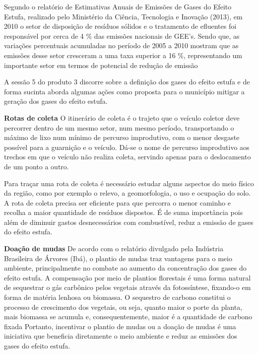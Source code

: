 Segundo o relatório de Estimativas Anuais de Emissões de Gases do Efeito Estufa, realizado pelo Ministério da Ciência, Tecnologia e Inovação (2013), em 2010 o setor de disposição de resíduos sólidos e o tratamento de efluentes foi responsável por cerca de 4 \% das emissões nacionais de GEE’s.
Sendo que, as variações percentuais acumuladas no período de 2005 a 2010 mostram que as emissões desse setor cresceram a uma taxa superior a 16 \%, representando um importante setor em termos de potencial de redução de emissão

A sessão 5 do produto 3 discorre sobre a definição dos gases do efeito estufa e de forma sucinta aborda algumas ações como proposta para o município mitigar a geração dos gases do efeito estufa. 

\textbf{Rotas de coleta}
O itinerário de coleta é o trajeto que o veículo coletor deve percorrer dentro de um mesmo setor, num mesmo período, transportando o máximo de lixo num mínimo de percurso improdutivo, com o menor desgaste possível para a guarnição e o veículo. Dá-se o nome de percurso improdutivo aos trechos em que o veículo não realiza coleta, servindo apenas para o deslocamento de um ponto a outro.\cite{dalmeida_manual_2018}

Para traçar uma rota de coleta é necessário estudar alguns aspectos do meio físico da região, como por exemplo o relevo, a geomorfologia, o uso e ocupação do solo. A rota de coleta precisa ser eficiente para que percorra o menor caminho e recolha a maior quantidade de resíduos dispostos. É de suma importância pois além de diminuir gastos desnecessários com combustível, reduz a emissão de gases do efeito estufa.

\textbf{Doação de mudas}
De acordo com o relatório divulgado pela Indústria Brasileira de Árvores (Ibá), o plantio de mudas traz vantagens para o meio ambiente, principalmente no combate ao aumento da concentração dos gases do efeito estufa.
A compensação por meio de plantios florestais é uma forma
natural de sequestrar o gás carbônico pelos vegetais
através da fotossíntese, fixando-o em forma de matéria
lenhosa ou biomassa. O sequestro de carbono constitui o
processo de crescimento dos vegetais, ou seja, quanto
maior o porte da planta, mais biomassa se acumula e,
consequentemente, maior é a quantidade de carbono fixada \cite{changman_sequestroc_2004} 
Portanto, incentivar o plantio de mudas ou a doação de mudas é uma iniciativa que beneficia diretamente o meio ambiente e reduz as emissões dos gases do efeito estufa.


